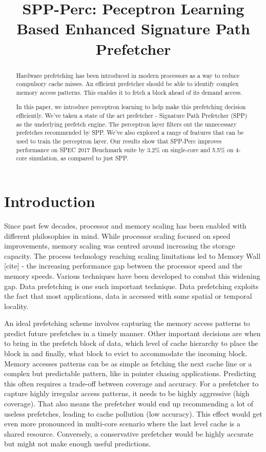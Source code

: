 \documentclass{sig-alternate}
\title{SPP-Perc: Peceptron Learning Based Enhanced Signature Path Prefetcher}
\author{}
\begin{document}
\maketitle
\thispagestyle{firstpage}
\pagestyle{plain}

\begin{abstract}

Hardware prefetching has been introduced in modern processors as a way to reduce compulsory cache misses. An efficient prefetcher should be able to identify complex memory access patterns. This enables it to fetch a block ahead of its demand access. 

In this paper, we introduce perceptron learning to help make this prefetching decision efficiently. We've taken a state of the art prefetcher - Signature Path Prefetcher (SPP) as the underlying prefetch engine. The perceptron layer filters out the unnecessary prefetches recommended by SPP. We've also explored a range of features that can be used to train the perceptron layer. Our results show that SPP-Perc improves performance on SPEC 2017 Benchmark suite by 3.2\% on single-core and 5.5\% on 4-core simulation, as compared to just SPP.

\end{abstract}

\section{Introduction}
Since past few decades, processor and memory scaling has been enabled with different philosophies in mind. While processor scaling focused on speed improvements, memory scaling was centred around increasing the storage capacity. The process technology reaching scaling limitations led to Memory Wall [cite] - the increasing performance gap between the processor speed and the memory speeds. Various techniques have been developed to combat this widening gap. Data prefetching is one such important technique. Data prefetching exploits the fact that most applications, data is accessed with some spatial or temporal locality.

An ideal prefetching scheme involves capturing the memory access patterns to predict future prefetches in a timely manner. Other important decisions are when to bring in the prefetch block of data, which level of cache hierarchy to place the block in and finally, what block to evict to accommodate the incoming block. Memory accesses patterns can be as simple as fetching the next cache line or a complex but predictable pattern, like in pointer chasing applications. Predicting this often requires a trade-off between coverage and accuracy. For a prefetcher to capture highly irregular access patterns, it needs to be highly aggressive (high coverage). That also means the prefetcher would end up recommending a lot of useless prefetches, leading to cache pollution (low accuracy). This effect would get even more pronounced in multi-core scenario where the last level cache is a shared resource. Conversely, a conservative prefetcher would be highly accurate but might not make enough useful predictions.
\end{document}
